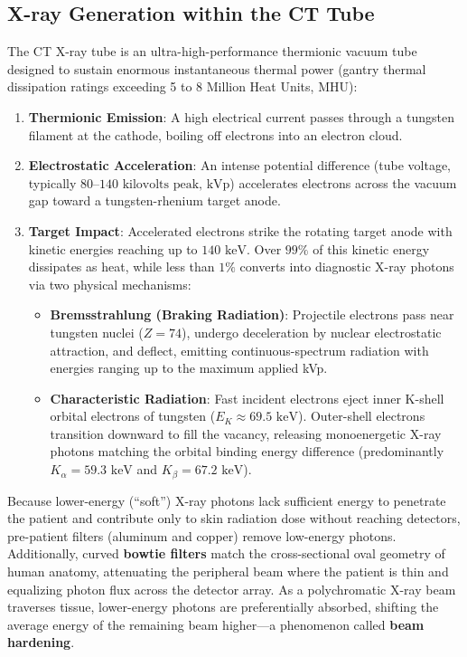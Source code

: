 \documentclass[11pt,a4paper]{article}
\begin{document}
\subsection{X-ray Generation within the CT Tube}
The CT X-ray tube is an ultra-high-performance thermionic vacuum tube designed to sustain enormous instantaneous thermal power (gantry thermal dissipation ratings exceeding 5 to 8 Million Heat Units, MHU):
\begin{enumerate}[leftmargin=*]
    \item \textbf{Thermionic Emission}: A high electrical current passes through a tungsten filament at the cathode, boiling off electrons into an electron cloud.
    \item \textbf{Electrostatic Acceleration}: An intense potential difference (tube voltage, typically $80\text{--}140\text{ kilovolts peak, kVp}$) accelerates electrons across the vacuum gap toward a tungsten-rhenium target anode.
    \item \textbf{Target Impact}: Accelerated electrons strike the rotating target anode with kinetic energies reaching up to $140\text{ keV}$. Over $99\%$ of this kinetic energy dissipates as heat, while less than $1\%$ converts into diagnostic X-ray photons via two physical mechanisms:
    \begin{itemize}
        \item \textbf{Bremsstrahlung (Braking Radiation)}: Projectile electrons pass near tungsten nuclei ($Z=74$), undergo deceleration by nuclear electrostatic attraction, and deflect, emitting continuous-spectrum radiation with energies ranging up to the maximum applied kVp.
        \item \textbf{Characteristic Radiation}: Fast incident electrons eject inner K-shell orbital electrons of tungsten ($E_K \approx 69.5\text{ keV}$). Outer-shell electrons transition downward to fill the vacancy, releasing monoenergetic X-ray photons matching the orbital binding energy difference (predominantly $K_\alpha = 59.3\text{ keV}$ and $K_\beta = 67.2\text{ keV}$).
    \end{itemize}
\end{enumerate}

\begin{physicsoverview}
Because lower-energy (``soft'') X-ray photons lack sufficient energy to penetrate the patient and contribute only to skin radiation dose without reaching detectors, pre-patient filters (aluminum and copper) remove low-energy photons. Additionally, curved \textbf{bowtie filters} match the cross-sectional oval geometry of human anatomy, attenuating the peripheral beam where the patient is thin and equalizing photon flux across the detector array. As a polychromatic X-ray beam traverses tissue, lower-energy photons are preferentially absorbed, shifting the average energy of the remaining beam higher—a phenomenon called \textbf{beam hardening}.
\end{physicsoverview}
\end{document}
